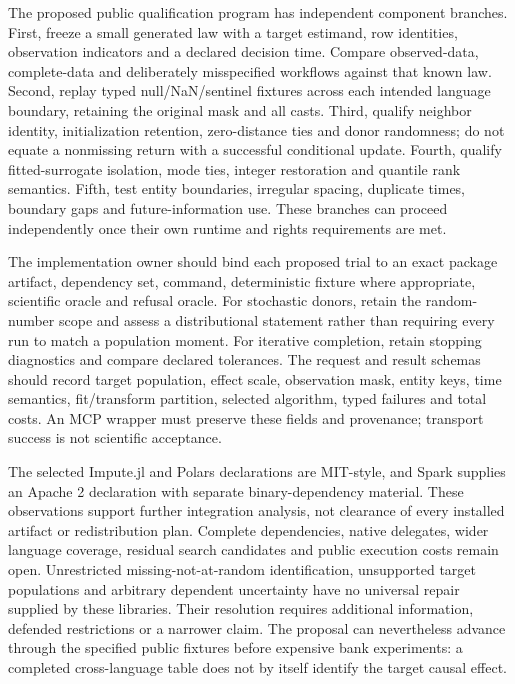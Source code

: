 The proposed public qualification program has independent component branches. First, freeze a small generated law with a target estimand, row identities, observation indicators and a declared decision time. Compare observed-data, complete-data and deliberately misspecified workflows against that known law. Second, replay typed null/NaN/sentinel fixtures across each intended language boundary, retaining the original mask and all casts. Third, qualify neighbor identity, initialization retention, zero-distance ties and donor randomness; do not equate a nonmissing return with a successful conditional update. Fourth, qualify fitted-surrogate isolation, mode ties, integer restoration and quantile rank semantics. Fifth, test entity boundaries, irregular spacing, duplicate times, boundary gaps and future-information use. These branches can proceed independently once their own runtime and rights requirements are met.\citep{exec25_otm_choice}

The implementation owner should bind each proposed trial to an exact package artifact, dependency set, command, deterministic fixture where appropriate, scientific oracle and refusal oracle. For stochastic donors, retain the random-number scope and assess a distributional statement rather than requiring every run to match a population moment. For iterative completion, retain stopping diagnostics and compare declared tolerances. The request and result schemas should record target population, effect scale, observation mask, entity keys, time semantics, fit/transform partition, selected algorithm, typed failures and total costs. An MCP wrapper must preserve these fields and provenance; transport success is not scientific acceptance.\citep{exec25_otm_choice}

The selected Impute.jl and Polars declarations are MIT-style, and Spark supplies an Apache 2 declaration with separate binary-dependency material. These observations support further integration analysis, not clearance of every installed artifact or redistribution plan. Complete dependencies, native delegates, wider language coverage, residual search candidates and public execution costs remain open. Unrestricted missing-not-at-random identification, unsupported target populations and arbitrary dependent uncertainty have no universal repair supplied by these libraries. Their resolution requires additional information, defended restrictions or a narrower claim. The proposal can nevertheless advance through the specified public fixtures before expensive bank experiments: a completed cross-language table does not by itself identify the target causal effect.\citep{exec25_otm_imputejl,exec25_otm_spark,exec25_otm_polars,exec25_otm_choice}
